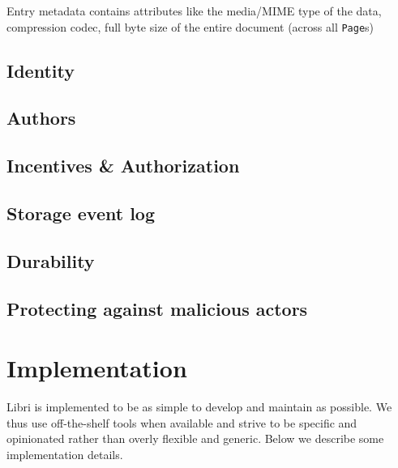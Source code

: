 \documentclass[10pt]{article}
\def\Page{\texttt{Page}}
\begin{document}
Entry metadata contains attributes like the media/MIME type of the data, compression codec, full byte size of the entire document (across all \Page{}s)


\subsection{Identity}
\label{sec:Identity}

\subsection{Authors}
\label{sec:Authors}

\subsection{Incentives \& Authorization}
\label{sec:Incentives}

\subsection{Storage event log}

\subsection{Durability}

\subsection{Protecting against malicious actors}

\section{Implementation}

Libri is implemented to be as simple to develop and maintain as possible. We thus use off-the-shelf tools when available and strive to be specific and opinionated rather than overly flexible and generic. Below we describe some implementation details. 
\end{document}
